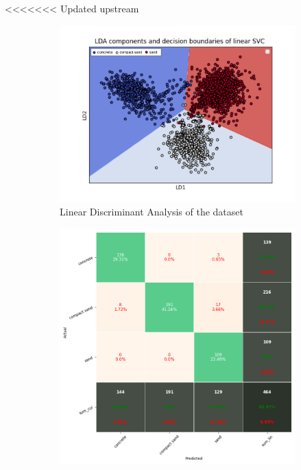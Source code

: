 \documentclass{article}
\begin{document}

<<<<<<< Updated upstream
\begin{figure}[!htb]
    \centering
    \begin{subfigure}[t]{0.48\textwidth}
        \includegraphics[width=\textwidth]{../figures/boundary_LDA_prevTesting_all_sand_concrete_compactsand.png}
        \caption{Linear Discriminant Analysis of the dataset}
    \end{subfigure}
    \begin{subfigure}[t]{0.48\textwidth}
        \includegraphics[trim={0 0 0 0},clip,width=\textwidth]{../figures/confusionmatrix_Train.png}

\end{subfigure}
\end{figure}
\end{document}
